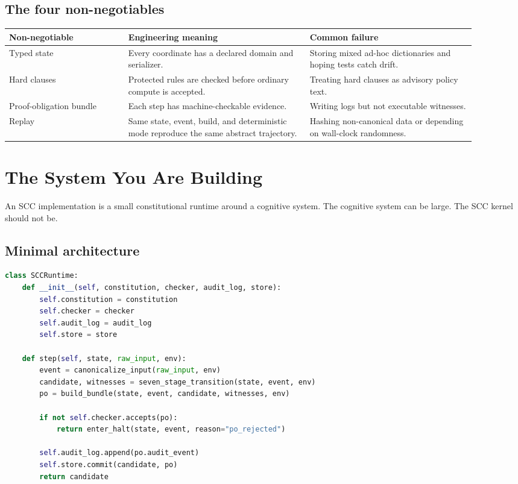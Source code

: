 \documentclass[11pt,oneside]{article}
\begin{document}
\subsection{The four non-negotiables}
\begin{longtable}{@{}p{0.23\linewidth}p{0.35\linewidth}p{0.32\linewidth}@{}}
\toprule
\textbf{Non-negotiable} & \textbf{Engineering meaning} & \textbf{Common failure} \\
\midrule
Typed state & Every coordinate has a declared domain and serializer. & Storing mixed ad-hoc dictionaries and hoping tests catch drift. \\
Hard clauses & Protected rules are checked before ordinary compute is accepted. & Treating hard clauses as advisory policy text. \\
Proof-obligation bundle & Each step has machine-checkable evidence. & Writing logs but not executable witnesses. \\
Replay & Same state, event, build, and deterministic mode reproduce the same abstract trajectory. & Hashing non-canonical data or depending on wall-clock randomness. \\
\bottomrule
\end{longtable}

\section{The System You Are Building}
An SCC implementation is a small constitutional runtime around a cognitive system. The cognitive system can be large. The SCC kernel should not be.

\subsection{Minimal architecture}
\begin{lstlisting}[language=Python,caption={Minimal SCC runtime shape.}]
class SCCRuntime:
    def __init__(self, constitution, checker, audit_log, store):
        self.constitution = constitution
        self.checker = checker
        self.audit_log = audit_log
        self.store = store

    def step(self, state, raw_input, env):
        event = canonicalize_input(raw_input, env)
        candidate, witnesses = seven_stage_transition(state, event, env)
        po = build_bundle(state, event, candidate, witnesses, env)

        if not self.checker.accepts(po):
            return enter_halt(state, event, reason="po_rejected")

        self.audit_log.append(po.audit_event)
        self.store.commit(candidate, po)
        return candidate
\end{lstlisting}
\end{document}
